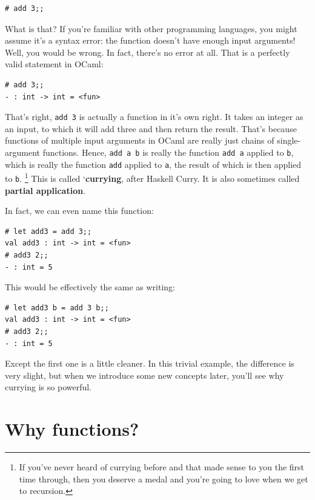 \documentclass[10pt]{book}
\begin{document}
\beforeverb
\begin{verbatim}
# add 3;;
\end{verbatim}
\afterverb

What is that? If you're familiar with other programming languages, you might 
assume it's a syntax error: the function doesn't have enough input arguments!
Well, you would be wrong. In fact, there's no error at all. That is a perfectly
valid statement in OCaml:

\beforeverb
\begin{verbatim}
# add 3;;
- : int -> int = <fun>
\end{verbatim}
\afterverb

That's right, {\tt add 3} is actually a function in it's own right. It takes an integer
as an input, to which it will add three and then return the result. That's because functions
of multiple input arguments in OCaml are really just chains of single-argument functions. 
Hence, {\tt add a b} is really the function {\tt add a} applied to {\tt b}, which is really 
the function {\tt add} applied to {\tt a}, the result of which is then applied to {\tt b}. 
\footnote{If you've never heard of currying before and that made sense to you the first 
time through, then you deserve a medal and you're going to love when we get to recursion.} 
This is called `{\bf currying}, after Haskell Curry. It is also sometimes called 
{\bf partial application}.


In fact, we can even name this function:

\beforeverb
\begin{verbatim}
# let add3 = add 3;;
val add3 : int -> int = <fun>
# add3 2;;
- : int = 5
\end{verbatim}
\afterverb

This would be effectively the same as writing:

\beforeverb
\begin{verbatim}
# let add3 b = add 3 b;;
val add3 : int -> int = <fun>
# add3 2;;
- : int = 5
\end{verbatim}
\afterverb
%
Except the first one is a little cleaner. In this trivial example, the difference is
very slight, but when we introduce some new concepts later, you'll see why currying
is so powerful.

\section{Why functions?}
\end{document}
